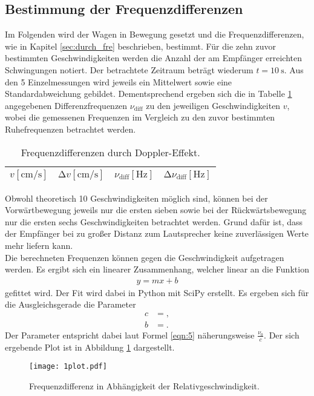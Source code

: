 \subsection{Bestimmung der Frequenzdifferenzen}
Im Folgenden wird der Wagen in Bewegung gesetzt und die Frequenzdifferenzen, wie in Kapitel \ref{sec:durch_fre} beschrieben, bestimmt.
Für die zehn zuvor bestimmten Geschwindigkeiten werden die Anzahl der am Empfänger erreichten Schwingungen notiert.
Der betrachtete Zeitraum beträgt wiederum $t = \SI{10}{\second}$.
Aus den 5 Einzelmessungen wird jeweils ein Mittelwert sowie eine Standardabweichung gebildet.
Dementsprechend ergeben sich die in Tabelle \ref{tab:diffe} angegebenen Differenzfrequenzen $\nu_{\text{diff}}$ zu den jeweiligen Geschwindigkeiten $v$, wobei die gemessenen Frequenzen im Vergleich zu den zuvor bestimmten Ruhefrequenzen betrachtet werden.
\begin{table}
  \centering
  \caption{Frequenzdifferenzen durch Doppler-Effekt.}
  \label{tab:diffe}
  \begin{tabular}{c c c c}
    \toprule
    {$v [\si{\centi\metre\per\second}]$} & {$\increment{v} [\si{\centi\metre\per\second}]$} & {$\nu_{\text{diff}} [\si{\hertz}]$} & {$\increment{\nu_{\text{diff}}} [\si{\hertz}]$}\\
    \midrule
    
    \bottomrule
  \end{tabular}
\end{table}
Obwohl theoretisch 10 Geschwindigkeiten möglich sind, können bei der Vorwärtbewegung jeweils nur die ersten sieben sowie bei der Rückwärtsbewegung nur die ersten sechs Geschwindigkeiten betrachtet werden.
Grund dafür ist, dass der Empfänger bei zu großer Distanz zum Lautsprecher keine zuverlässigen Werte mehr liefern kann.\\

Die berechneten Frequenzen können gegen die Geschwindigkeit aufgetragen werden.
Es ergibt sich ein linearer Zusammenhang, welcher linear an die Funktion
\begin{align*}
  y = m x + b
\end{align*}
gefittet wird.
Der Fit wird dabei in Python mit SciPy erstellt.
Es ergeben sich für die Ausgleichsgerade die Parameter
\begin{align*}
  c &= , \\
  b &= .
\end{align*}
Der Parameter entspricht dabei laut Formel \ref{eqn:5} näherungsweise $\frac{ \nu_0}{c}$.
Der sich ergebende Plot ist in Abbildung \ref{afig:1} dargestellt.
\begin{figure}
  \centering
  \texttt{[image: 1plot.pdf]}
  \caption{Frequenzdifferenz in Abhängigkeit der Relativgeschwindigkeit.}
  \label{afig:1}
\end{figure}

